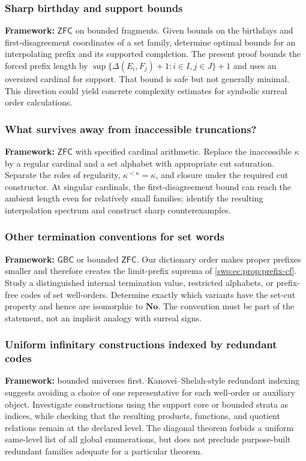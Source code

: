 \documentclass[11pt]{article}
\theoremstyle{definition}
\theoremstyle{remark}
\newcommand{\No}{\mathbf{No}}
\newcommand{\GBC}{\mathsf{GBC}}
\newcommand{\ZFC}{\mathsf{ZFC}}
\begin{document}
\subsubsection{Sharp birthday and support bounds}
\textbf{Framework:} $\ZFC$ on bounded fragments. Given bounds on the
birthdays and first-disagreement coordinates of a set family, determine
optimal bounds for an interpolating prefix and its supported completion.
The present proof bounds the forced prefix length by
$\sup\{\Delta(E_i,F_j)+1:i\in I,j\in J\}+1$ and uses an oversized
cardinal for support. That bound is
safe but not generally minimal. This direction could yield concrete
complexity estimates for symbolic surreal order calculations.

\subsubsection{What survives away from inaccessible truncations?}
\textbf{Framework:} $\ZFC$ with specified cardinal arithmetic. Replace
the inaccessible $\kappa$ by a regular cardinal and a set alphabet with
appropriate cut saturation. Separate the roles of regularity,
$\kappa^{<\kappa}=\kappa$, and closure under the required cut constructor.
At singular cardinals, the first-disagreement bound can reach the
ambient length even for relatively small families; identify the
resulting interpolation spectrum and construct sharp counterexamples.

\subsubsection{Other termination conventions for set words}
\textbf{Framework:} $\GBC$ or bounded $\ZFC$. Our dictionary order makes
proper prefixes smaller and therefore creates the limit-prefix
suprema of \cref{swo:ec:prop:prefix-cf}. Study a distinguished internal
termination value, restricted alphabets, or prefix-free codes of set
well-orders. Determine exactly which variants have the set-cut property
and hence are isomorphic to $\No$. The convention must be part of the
statement, not an implicit analogy with surreal signs.

\subsubsection{Uniform infinitary constructions indexed by redundant codes}
\textbf{Framework:} bounded universes first. Kanovei--Shelah-style
redundant indexing suggests avoiding a choice of one representative
for each well-order or auxiliary object. Investigate constructions
using the support core or bounded strata as indices, while checking
that the resulting products, functions, and quotient relations remain
at the declared level. The diagonal theorem forbids a uniform
same-level list of all global enumerations, but does not preclude
purpose-built redundant families adequate for a particular theorem.
\end{document}
